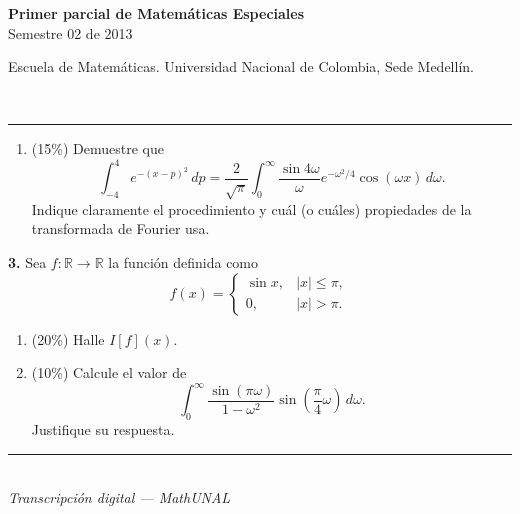 \documentclass[11pt]{article}
\newcommand{\examheader}{%
  \noindent
  \begin{minipage}[t]{0.6\linewidth}
    {\small\bfseries Primer parcial de Matem\'aticas Especiales}\\
    {\small Semestre 02 de 2013}
  \end{minipage}%
  \hfill
  \begin{minipage}[t]{0.35\linewidth}
    \raggedleft\small Escuela de Matem\'aticas. Universidad Nacional de Colombia, Sede Medell\'in.
  \end{minipage}\\[2pt]
  \rule{\linewidth}{0.6pt}
}
\newcommand{\examfooter}{%
  \vfill
  \rule{\linewidth}{0.4pt}\\[1pt]
  {\scriptsize\textit{Transcripci\'on digital --- MathUNAL}\hfill\textcolor{unalblue}{\textbf{\thepage}}}
}
\begin{document}
\clearpage
\examheader
\vspace{6pt}

\begin{enumerate}[label=\alph*), itemsep=4pt, topsep=4pt, leftmargin=1.8em, start=3]
  \item (15\%) Demuestre que
  \[
  \int_{-4}^{4} e^{-(x-p)^2}\,dp = \frac{2}{\sqrt{\pi}}\int_0^{\infty} \frac{\sin 4\omega}{\omega}e^{-\omega^2/4}\cos(\omega x)\,d\omega.
  \]
  Indique claramente el procedimiento y cu\'al (o cu\'ales) propiedades de la transformada de Fourier usa.
\end{enumerate}

\vspace{6pt}
\textbf{3.} Sea $f:\mathbb{R}\longrightarrow\mathbb{R}$ la funci\'on definida como
\[
f(x) = \begin{cases} \sin x, & |x|\leq \pi, \\ 0, & |x|>\pi. \end{cases}
\]

\begin{enumerate}[label=\alph*), itemsep=4pt, topsep=4pt, leftmargin=1.8em]
  \item (20\%) Halle $I[f](x)$.
  \item (10\%) Calcule el valor de
  \[
  \int_0^{\infty} \frac{\sin(\pi\omega)}{1-\omega^2}\sin\left(\frac{\pi}{4}\omega\right)\,d\omega.
  \]
  Justifique su respuesta.
\end{enumerate}

\examfooter
\end{document}
